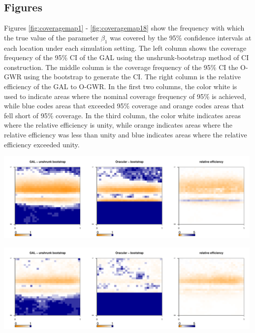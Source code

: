 
	\subsection{Figures}
	Figures \ref{fig:coveragemap1} - \ref{fig:coveragemap18} show the frequency with which the true value of the parameter $\beta_1$ was covered by the 95\% confidence intervals at each location under each simulation setting. The left column shows the coverage frequency of the 95\% CI of the GAL using the unshrunk-bootstrap method of CI construction. The middle column is the coverage frequency of the 95\% CI the O-GWR using the bootstrap to generate the CI. The right column is the relative efficiency of the GAL to O-GWR. In the first two columns, the color white is used to indicate areas where the nominal coverage frequency of 95\% is achieved, while blue codes areas that exceeded 95\% coverage and orange codes areas that fell short of 95\% coverage. In the third column, the color white indicates areas where the relative efficiency is unity, while orange indicates areas where the relative efficiency was less than unity and blue indicates areas where the relative efficiency exceeded unity.\\	
	
	
	\begin{center}
		\includegraphics[width=0.99\textwidth]{../../figures/X1-28-1.pdf}
	\end{center}
        
	\begin{center}
		\includegraphics[width=0.99\textwidth]{../../figures/X1-28-2.pdf}
	\end{center}
	

